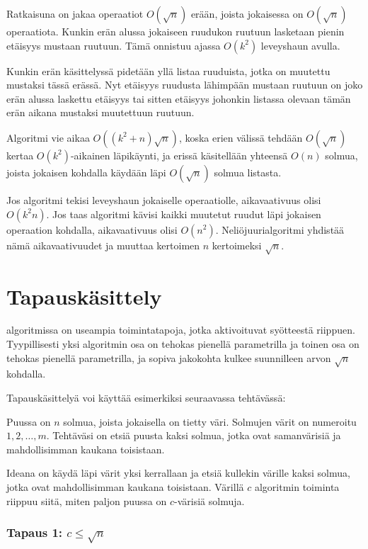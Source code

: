 Ratkaisuna on jakaa operaatiot $O(\sqrt n)$ erään,
joista jokaisessa on $O(\sqrt n)$ operaatiota.
Kunkin erän alussa jokaiseen ruudukon ruutuun
lasketaan pienin etäisyys mustaan ruutuun.
Tämä onnistuu ajassa $O(k^2)$ leveyshaun avulla.

Kunkin erän käsittelyssä pidetään yllä listaa ruuduista,
jotka on muutettu mustaksi tässä erässä.
Nyt etäisyys ruudusta lähimpään mustaan ruutuun
on joko erän alussa laskettu etäisyys tai sitten
etäisyys johonkin listassa olevaan tämän erän aikana mustaksi
muutettuun ruutuun.

Algoritmi vie aikaa $O((k^2+n) \sqrt n)$,
koska erien välissä tehdään $O(\sqrt n)$ kertaa
$O(k^2)$-aikainen läpikäynti, ja
erissä käsitellään yhteensä $O(n)$ solmua,
joista jokaisen kohdalla käydään läpi
$O(\sqrt n)$ solmua listasta.

Jos algoritmi tekisi leveyshaun jokaiselle operaatiolle,
aikavaativuus olisi $O(k^2 n)$.
Jos taas algoritmi kävisi kaikki muutetut ruudut läpi
jokaisen operaation kohdalla,
aikavaativuus olisi $O(n^2)$.
Neliöjuurialgoritmi yhdistää nämä aikavaativuudet
ja muuttaa kertoimen $n$ kertoimeksi $\sqrt n$.

\section{Tapauskäsittely}


 algoritmissa on useampia
toimintatapoja, jotka aktivoituvat syötteestä riippuen.
Tyypillisesti yksi algoritmin osa on tehokas
pienellä parametrilla
ja toinen osa on tehokas pienellä parametrilla,
ja sopiva jakokohta kulkee suunnilleen arvon $\sqrt n$ kohdalla.

Tapauskäsittelyä voi käyttää esimerkiksi seuraavassa
tehtävässä:

\begin{task}
Puussa on $n$ solmua, joista jokaisella on tietty väri.
Solmujen värit on numeroitu $1,2,\ldots,m$.
Tehtäväsi on etsiä puusta kaksi solmua,
jotka ovat samanvärisiä ja mahdollisimman
kaukana toisistaan.
\end{task}

Ideana on käydä läpi värit yksi kerrallaan ja
etsiä kullekin värille kaksi solmua, jotka ovat
mahdollisimman kaukana toisistaan.
Värillä $c$ algoritmin toiminta riippuu siitä,
miten paljon puussa on $c$-värisiä solmuja.

\subsubsection*{Tapaus 1: $c \le \sqrt n$}

